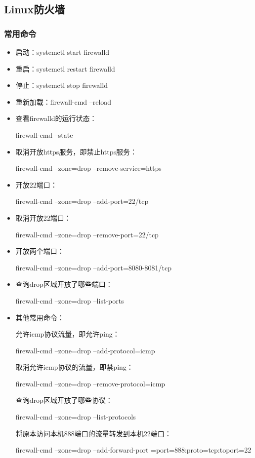 \documentclass[UTF8]{article}%
\begin{document}
\subsection{Linux防火墙}

\subsubsection{常用命令}

\begin{itemize}
    \item 启动：systemctl start firewalld
    \item 重启：systemctl restart firewalld
    \item 停止：systemctl stop firewalld
    \item 重新加载：firewall-cmd --reload
    \item 查看firewalld的运行状态：
    
        firewall-cmd --state

    \item 取消开放https服务，即禁止https服务：
    
        firewall-cmd --zone=drop --remove-service=https

    \item 开放22端口：
    
        firewall-cmd --zone=drop --add-port=22/tcp

    \item 取消开放22端口：
    
        firewall-cmd --zone=drop --remove-port=22/tcp

    \item 开放两个端口：
    
    firewall-cmd --zone=drop --add-port=8080-8081/tcp

    \item 查询drop区域开放了哪些端口：
    
    firewall-cmd --zone=drop --list-ports

    \item 其他常用命令：
    
    允许icmp协议流量，即允许ping：

    firewall-cmd --zone=drop --add-protocol=icmp

    取消允许icmp协议的流量，即禁ping：

    firewall-cmd --zone=drop --remove-protocol=icmp
    
    查询drop区域开放了哪些协议：

    firewall-cmd --zone=drop --list-protocols

    将原本访问本机888端口的流量转发到本机22端口：
    
    firewall-cmd --zone=drop --add-forward-port
    =port=888:proto=tcp:toport=22
\end{itemize}
\end{document}
